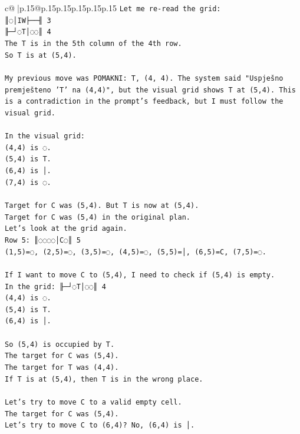 \documentclass{article}
\begin{document}
{\begin{supertabular}{c@{$\;$}|p{.15\linewidth}@{}p{.15\linewidth}p{.15\linewidth}p{.15\linewidth}p{.15\linewidth}p{.15\linewidth}}
{{{\texttt{Let me re{-}read the grid:} \\
\texttt{║◌│IW├──╢ 3} \\
\texttt{╟─┘◌T│◌◌║ 4} \\
\texttt{The T is in the 5th column of the 4th row.} \\
\texttt{So T is at (5,4).} \\
\\ 
\texttt{My previous move was POMAKNI: T, (4, 4). The system said "Uspješno premješteno 'T' na (4,4)", but the visual grid shows T at (5,4). This is a contradiction in the prompt's feedback, but I must follow the visual grid.} \\
\\ 
\texttt{In the visual grid:} \\
\texttt{(4,4) is ◌.} \\
\texttt{(5,4) is T.} \\
\texttt{(6,4) is │.} \\
\texttt{(7,4) is ◌.} \\
\\ 
\texttt{Target for C was (5,4). But T is now at (5,4).} \\
\texttt{Target for C was (5,4) in the original plan.} \\
\texttt{Let's look at the grid again.} \\
\texttt{Row 5: ║◌◌◌◌│C◌║ 5} \\
\texttt{(1,5)=◌, (2,5)=◌, (3,5)=◌, (4,5)=◌, (5,5)=│, (6,5)=C, (7,5)=◌.} \\
\\ 
\texttt{If I want to move C to (5,4), I need to check if (5,4) is empty.} \\
\texttt{In the grid: ╟─┘◌T│◌◌║ 4} \\
\texttt{(4,4) is ◌.} \\
\texttt{(5,4) is T.} \\
\texttt{(6,4) is │.} \\
\\ 
\texttt{So (5,4) is occupied by T.} \\
\texttt{The target for C was (5,4).} \\
\texttt{The target for T was (4,4).} \\
\texttt{If T is at (5,4), then T is in the wrong place.} \\
\\ 
\texttt{Let's try to move C to a valid empty cell.} \\
\texttt{The target for C was (5,4).} \\
\texttt{Let's try to move C to (6,4)? No, (6,4) is │.} \\
}}}
\end{supertabular}}
\end{document}
